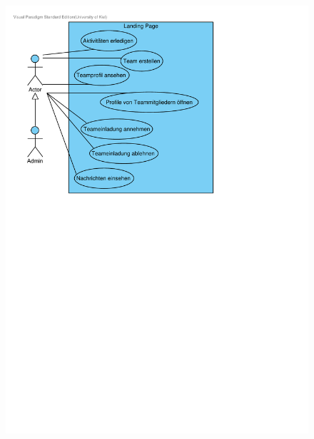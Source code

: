 \documentclass[10pt,a4paper]{article}
\begin{document}
		\begin{figure}[h!]
			\includegraphics[width=\linewidth]{gfx/webseite/LandingPage.pdf}
		\end{figure}
\end{document}
